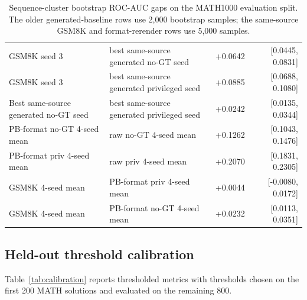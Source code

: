 \documentclass{article}
\begin{document}
\begin{table}[h]
{\begin{tabular}{llrr}
\midrule
GSM8K seed 3 & best same-source generated no-GT seed & +0.0642 & [0.0445, 0.0831] \\
GSM8K seed 3 & best same-source generated privileged seed & +0.0885 & [0.0688, 0.1080] \\
Best same-source generated no-GT seed & best same-source generated privileged seed & +0.0242 & [0.0135, 0.0344] \\
\midrule
PB-format no-GT 4-seed mean & raw no-GT 4-seed mean & +0.1262 & [0.1043, 0.1476] \\
PB-format priv 4-seed mean & raw priv 4-seed mean & +0.2070 & [0.1831, 0.2305] \\
GSM8K 4-seed mean & PB-format priv 4-seed mean & +0.0044 & [-0.0080, 0.0172] \\
GSM8K 4-seed mean & PB-format no-GT 4-seed mean & +0.0232 & [0.0113, 0.0351] \\
\bottomrule
\end{tabular}}
\caption{Sequence-cluster bootstrap ROC-AUC gaps on the MATH1000 evaluation split. The older generated-baseline rows use 2,000 bootstrap samples; the same-source GSM8K and format-rerender rows use 5,000 samples.}
\label{tab:bootstrap}
\end{table}

\subsection{Held-out threshold calibration}

Table~\ref{tab:calibration} reports thresholded metrics with thresholds chosen on the first 200 MATH solutions and evaluated on the remaining 800.
\end{document}
